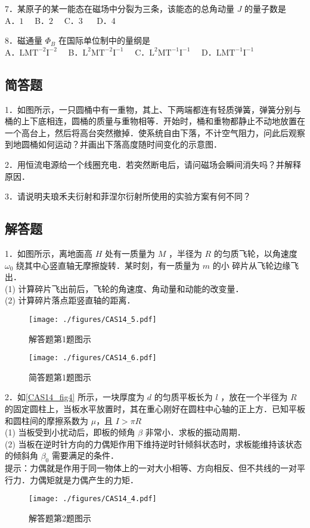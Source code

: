 7．某原子的某一能态在磁场中分裂为三条，该能态的总角动量 $J$ 的量子数是\\
A．$1\quad $ B．$2 \quad$ C．3 $\quad$ D．4

8．磁通量 $\Phi_B$ 在国际单位制中的量纲是\\
A．$\mathrm{LMT^{-2}I^{-2}}\quad$ B．$\mathrm{L^{2}MT^{-2}I^{-1}}\quad$ C．$\mathrm{L^{2}MT^{-1}I^{-1}}\quad$ D．$\mathrm{LMT^{-1}I^{-1}}$

\subsection{简答题}
1．如图所示，一只圆桶中有一重物，其上、下两端都连有轻质弹簧，弹簧分别与桶的上下底相连，圆桶的质量与重物相等．开始时，桶和重物都静止不动地放置在一个高台上，然后将高台突然撤掉．使系统自由下落，不计空气阻力，问此后观察到地圆桶如何运动？并画出下落高度随时间变化的示意图．


2．用恒流电源给一个线圈充电．若突然断电后，请问磁场会瞬间消失吗？并解释原因．


3．请说明夫琅禾夫衍射和菲涅尔衍射所使用的实验方案有何不同？


\subsection{解答题}
1．如图所示，离地面高 $H$ 处有一质量为 $M$ ，半径为 $R$ 的匀质飞轮，以角速度 $\omega_0$ 绕其中心竖直轴无摩擦旋转．某时刻，有一质量为 $m$ 的小 碎片从飞轮边缘飞出．\\
(1) 计算碎片飞出前后，飞轮的角速度、角动量和动能的改变量．\\
(2) 计算碎片落点距竖直轴的距离．
\begin{figure}[ht]
\centering
\texttt{[image: ./figures/CAS14\_5.pdf]}
\caption{解答题第1题图示} \label{CAS14_fig5}
\end{figure}
\begin{figure}[ht]
\centering
\texttt{[image: ./figures/CAS14\_6.pdf]}
\caption{简答题第1题图示} \label{CAS14_fig6}
\end{figure}
2．如\autoref{CAS14_fig4} 所示，一块厚度为 $d$ 的匀质平板长为 $l$ ，放在一个半径为 $R$ 的固定圆柱上，当板水平放置时，其在重心刚好在圆柱中心轴的正上方．已知平板和圆柱间的摩擦系数为 $\mu$，且 $I>\pi R$\\
(1) 当板受到小扰动后，即板的倾角 $\beta$ 非常小．求板的振动周期．\\
(2) 当板在逆时针方向的力偶矩作用下维持逆时针倾斜状态时，求板能维持该状态的倾斜角 $\beta_0$ 需要满足的条件．\\
提示：力偶就是作用于同一物体上的一对大小相等、方向相反、但不共线的一对平行力．力偶矩就是力偶产生的力矩．
\begin{figure}[ht]
\centering
\texttt{[image: ./figures/CAS14\_4.pdf]}
\caption{解答题第2题图示} \label{CAS14_fig4}
\end{figure}

